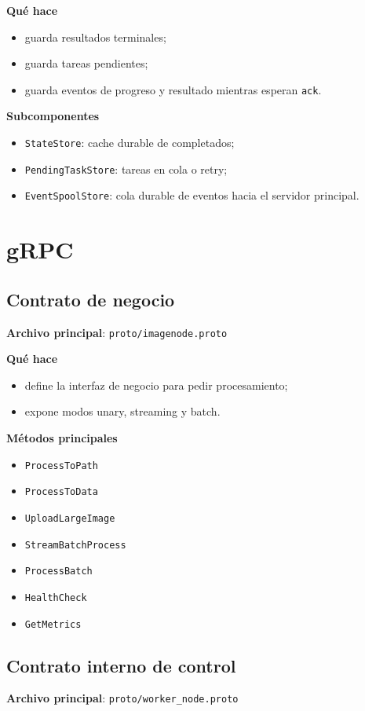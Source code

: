 \documentclass[11pt]{article}
\begin{document}
\textbf{Qué hace}
\begin{itemize}
\item guarda resultados terminales;
\item guarda tareas pendientes;
\item guarda eventos de progreso y resultado mientras esperan \texttt{ack}.
\end{itemize}

\textbf{Subcomponentes}
\begin{itemize}
\item \texttt{StateStore}: cache durable de completados;
\item \texttt{PendingTaskStore}: tareas en cola o retry;
\item \texttt{EventSpoolStore}: cola durable de eventos hacia el servidor principal.
\end{itemize}

\section{gRPC}

\subsection{Contrato de negocio}
\textbf{Archivo principal}: \texttt{proto/imagenode.proto}

\textbf{Qué hace}
\begin{itemize}
\item define la interfaz de negocio para pedir procesamiento;
\item expone modos unary, streaming y batch.
\end{itemize}

\textbf{Métodos principales}
\begin{itemize}
\item \texttt{ProcessToPath}
\item \texttt{ProcessToData}
\item \texttt{UploadLargeImage}
\item \texttt{StreamBatchProcess}
\item \texttt{ProcessBatch}
\item \texttt{HealthCheck}
\item \texttt{GetMetrics}
\end{itemize}

\subsection{Contrato interno de control}
\textbf{Archivo principal}: \texttt{proto/worker\_node.proto}
\end{document}
